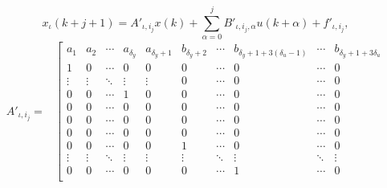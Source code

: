 %
\begin{equation}\label{eqLTIleavesSinglState}
	x_\iota(k+j+1) = A'_{\iota,i_j}x(k) + \sum_{\alpha = 0}^{j}{B'_{\iota,i_j,\alpha}u(k+\alpha)} + f'_{\iota,i_j},
\end{equation}
\begin{equation}\label{eqLeafModel}
\begin{aligned}
A'_{\iota,i_j} =& \left[\begin{array}{cccccccccc}
a_1       & a_2       & \cdots & a_{\delta_y } & a_{\delta_y + 1} & b_{\delta_y + 2} & \cdots & b_{\delta_y + 1+ 3(\delta_u-1)} & \cdots & b_{\delta_y + 1 + 3\delta_u} \\
1         & 0         & \cdots & 0             & 0                & 0                & \cdots & 0                               & \cdots & 0                            \\
\vdots    & \vdots    & \ddots & \vdots        & \vdots           & 0                & \cdots & 0                               & \cdots & 0                            \\
0         & 0         & \cdots & 1             & 0                & 0                & \cdots & 0                               & \cdots & 0                            \\
0         & 0         & \cdots & 0             & 0                & 0                & \cdots & 0                               & \cdots & 0                            \\
0         & 0         & \cdots & 0             & 0                & 0                & \cdots & 0                               & \cdots & 0                            \\
0         & 0         & \cdots & 0             & 0                & 0                & \cdots & 0                               & \cdots & 0                            \\
0         & 0         & \cdots & 0             & 0                & 1                & \cdots & 0                               & \cdots & 0                            \\
\vdots    & \vdots    & \ddots & \vdots        & \vdots           & \vdots           & \ddots & \vdots                          & \ddots & \vdots                       \\
0         & 0         & \cdots & 0             & 0                & 0                & \cdots & 1                               & \cdots & 0                            \\


\end{array}
\end{aligned}
\end{equation}
